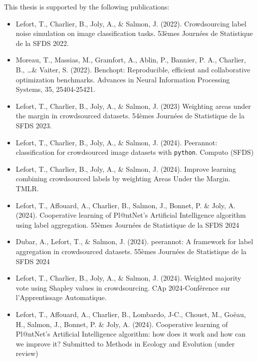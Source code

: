 This thesis is supported by the following publications:
\begin{itemize}
    \item Lefort, T., Charlier, B., Joly, A., \& Salmon, J. (2022). Crowdsourcing label noise simulation on image classification tasks. 53èmes Journées de Statistique de la SFDS 2022.
    \item Moreau, T., Massias, M., Gramfort, A., Ablin, P., Bannier, P. A., Charlier, B., \dots \& Vaiter, S. (2022). Benchopt: Reproducible, efficient and collaborative optimization benchmarks. Advances in Neural Information Processing Systems, 35, 25404-25421.
    \item Lefort, T., Charlier, B., Joly, A., \& Salmon, J. (2023) Weighting areas under the margin in crowdsourced datasets. 54èmes Journées de Statistique de la SFDS 2023.
    \item Lefort, T., Charlier, B., Joly, A., \& Salmon, J. (2024). Peerannot: classification for crowdsourced image datasets with \texttt{python}. Computo (SFDS)
    \item Lefort, T., Charlier, B., Joly, A., \& Salmon, J. (2024). Improve learning combining crowdsourced labels by weighting Areas Under the Margin. TMLR.
    \item Lefort, T., Affouard, A., Charlier, B., Salmon, J., Bonnet, P. \& Joly, A. (2024). Cooperative learning of Pl@ntNet's Artificial Intelligence algorithm using label aggregation. 55èmes Journées de Statistique de la SFDS 2024
    \item Dubar, A., Lefort, T., \& Salmon, J. (2024). peerannot: A framework for label aggregation in crowdsourced datasets. 55èmes Journées de Statistique de la SFDS 2024
    \item Lefort, T., Charlier, B., Joly, A., \& Salmon, J. (2024). Weighted majority vote using Shapley values in crowdsourcing. CAp 2024-Conférence sur l'Apprentissage Automatique.
    \item Lefort, T., Affouard, A., Charlier, B., Lombardo, J-C., Chouet, M., Goëau, H., Salmon, J., Bonnet, P. \& Joly, A. (2024). Cooperative learning of Pl@ntNet's Artificial Intelligence algorithm: how does it work and how can we improve it? Submitted to Methods in Ecology and Evolution (under review)
\end{itemize}

